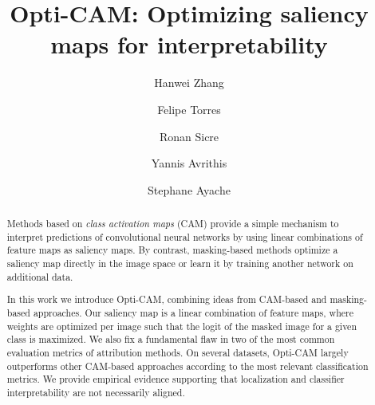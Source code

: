 \documentclass[preprint,3p,10pt]{elsarticle}
\begin{document}




\newcommand{\ronan}[1]{#1}
\newcommand{\iavr}[1]{#1}
\newcommand{\stephane}[1]{#1}
\newcommand{\redred}[1]{#1}
\newcommand{\hw}[1]{{\color{olive}{#1}}}
\newcommand{\modify}[1]{{{#1}}}


\begin{frontmatter}
\title{Opti-CAM: Optimizing saliency maps for interpretability}


\author[1]{Hanwei Zhang}
\author[1]{Felipe Torres}
\author[1]{Ronan Sicre}
\author[2]{Yannis Avrithis}
\author[1]{Stephane Ayache}






\begin{abstract}
Methods based on \emph{class activation maps} (CAM) provide a simple mechanism to interpret predictions of convolutional neural networks by using linear combinations of feature maps as saliency maps. By contrast, masking-based methods optimize a saliency map directly in the image space or learn it by training another network on additional data.

In this work we introduce Opti-CAM, combining ideas from CAM-based and masking-based approaches. Our saliency map is a linear combination of feature maps, where weights are optimized per image such that the logit of the masked image for a given class is maximized. We also fix a fundamental flaw in two of the most common evaluation metrics of attribution methods. On several datasets, Opti-CAM largely outperforms other CAM-based approaches according to the most relevant classification metrics. We provide empirical evidence supporting that localization and classifier interpretability are not necessarily aligned.
\end{abstract}


\end{frontmatter}
\end{document}
